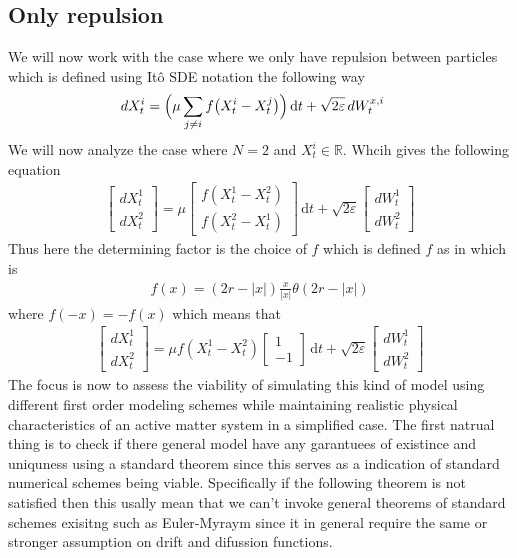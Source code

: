 \documentclass[11pt]{article}
\newcommand{\R}{\mathbb{R}}
\newcommand{\1}{\mathbbm{1}}
\newcommand{\dt}{\,\mathrm{d}t}
\theoremstyle{plain}
\theoremstyle{definition}
\theoremstyle{remark}
\begin{document}
\subsection{Only repulsion}
We will now work with the case where we only have repulsion between particles which is defined using It\^o SDE notation the following way
\begin{align}
dX_t^i
&=
\Bigl(\mu\sum_{j\neq i} f\bigl(X_t^i - X_t^j\bigr) \Bigr)\dt
+ \sqrt{2\varepsilon}\,dW_t^{x,i}
\label{eq:ito-x-reponly}
\end{align}
We will now analyze the case where $N=2$ and $X_t^i \in \R$. Whcih gives the following equation
\begin{align}
\begin{bmatrix}
dX_t^1 \\
dX_t^2
\end{bmatrix} = \mu \begin{bmatrix}
f( X_t^1-X_t^2) \\
f( X_t^2- X_t^1)
\end{bmatrix}\dt +\sqrt{2 \varepsilon} \begin{bmatrix}
dW_t^1 \\
dW_t^2
\end{bmatrix}
\label{eq:ito-x-2dreponly}
\end{align}
Thus here the determining factor is the choice of $f$ which is defined $f$ as in \citet{boffi2024deep} which is 
\begin{align}
f(x)=(2r-|x|)\frac{x}{|x|}\theta(2r-|x|) 
\label{eq:nonsmooth-pontential}
\end{align}
where $f(-x)=-f(x)$ which means that
\begin{align}
\begin{bmatrix}
dX_t^1 \\
dX_t^2
\end{bmatrix} = \mu f( X_t^1-X_t^2)\begin{bmatrix}
1 \\
-1
\end{bmatrix}\dt +\sqrt{2 \varepsilon} \begin{bmatrix}
dW_t^1 \\
dW_t^2
\end{bmatrix}
\label{eq:ito-x-2dreponlyspecific}
\end{align}
The focus is now to assess the viability of simulating this kind of model using different first order modeling schemes while maintaining realistic physical characteristics of an active matter system in a simplified case. The first natrual thing is to check if there general model have any garantuees of existince and uniquness using a standard theorem since this serves as a indication of standard numerical schemes being viable. Specifically if the following theorem is not satisfied then this usally mean that we can't invoke general theorems of standard schemes exisitng such as Euler-Myraym since it in  general require the same or stronger assumption on drift and difussion functions.
\end{document}
